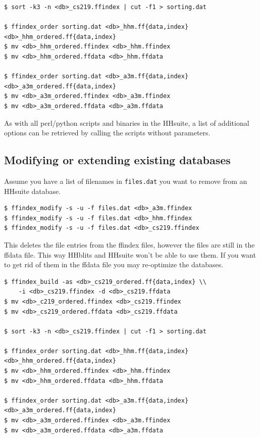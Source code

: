 \documentclass[11pt,a4paper]{article}
\begin{document}
\begin{verbatim}
$ sort -k3 -n <db>_cs219.ffindex | cut -f1 > sorting.dat

$ ffindex_order sorting.dat <db>_hhm.ff{data,index} <db>_hhm_ordered.ff{data,index}
$ mv <db>_hhm_ordered.ffindex <db>_hhm.ffindex
$ mv <db>_hhm_ordered.ffdata <db>_hhm.ffdata

$ ffindex_order sorting.dat <db>_a3m.ff{data,index} <db>_a3m_ordered.ff{data,index}
$ mv <db>_a3m_ordered.ffindex <db>_a3m.ffindex
$ mv <db>_a3m_ordered.ffdata <db>_a3m.ffdata
\end{verbatim}

As with all perl/python scripts and binaries in the HHsuite, a list of additional options can be retrieved by calling the scripts without parameters.


\subsection{Modifying or extending existing databases}

Assume you have a list of filenames in \verb`files.dat` you want to remove from an HHsuite database.

\begin{verbatim}
$ ffindex_modify -s -u -f files.dat <db>_a3m.ffindex
$ ffindex_modify -s -u -f files.dat <db>_hhm.ffindex
$ ffindex_modify -s -u -f files.dat <db>_cs219.ffindex
\end{verbatim}

This deletes the file entries from the ffindex files, however the files are still in the ffdata file.
This way HHblits and HHsuite won't be able to use them. If you want to get rid of them in the ffdata file
you may re-optimize the databases.

\begin{verbatim}
$ ffindex_build -as <db>_cs219_ordered.ff{data,index} \\
    -i <db>_cs219.ffindex -d <db>_cs219.ffdata
$ mv <db>_c219_ordered.ffindex <db>_cs219.ffindex
$ mv <db>_cs219_ordered.ffdata <db>_cs219.ffdata

$ sort -k3 -n <db>_cs219.ffindex | cut -f1 > sorting.dat

$ ffindex_order sorting.dat <db>_hhm.ff{data,index} <db>_hhm_ordered.ff{data,index}
$ mv <db>_hhm_ordered.ffindex <db>_hhm.ffindex
$ mv <db>_hhm_ordered.ffdata <db>_hhm.ffdata

$ ffindex_order sorting.dat <db>_a3m.ff{data,index} <db>_a3m_ordered.ff{data,index}
$ mv <db>_a3m_ordered.ffindex <db>_a3m.ffindex
$ mv <db>_a3m_ordered.ffdata <db>_a3m.ffdata
\end{verbatim}
\end{document}
